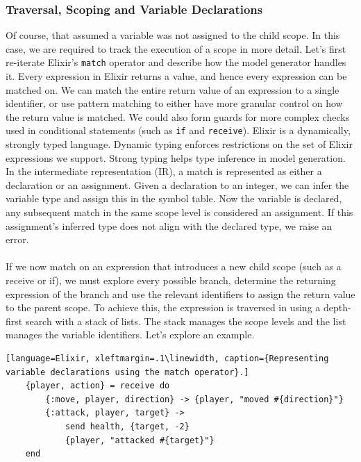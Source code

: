 \subsubsection{Traversal, Scoping and Variable Declarations}
Of course, that assumed a variable was not assigned to the child scope. In this case, we are required to track the execution of a scope in more detail. Let's first re-iterate Elixir's \texttt{match} operator and describe how the model generator handles it. Every expression in Elixir returns a value, and hence every expression can be matched on. We can match the entire return value of an expression to a single identifier, or use pattern matching to either have more granular control on how the return value is matched. We could also form guards for more complex checks used in conditional statements (such as \texttt{if} and \texttt{receive}). Elixir is a dynamically, strongly typed language. Dynamic typing enforces restrictions on the set of Elixir expressions we support. Strong typing helps type inference in model generation. In the intermediate representation (IR), a match is represented as either a declaration or an assignment. Given a declaration to an integer, we can infer the variable type and assign this in the symbol table. Now the variable is declared, any subsequent match in the same scope level is considered an assignment. If this assignment's inferred type does not align with the declared type, we raise an error.
\\ \\
If we now match on an expression that introduces a new child scope (such as a receive or if), we must explore every possible branch, determine the returning expression of the branch and use the relevant identifiers to assign the return value to the parent scope. To achieve this, the expression is traversed in using a depth-first search with a stack of lists. The stack manages the scope levels and the list manages the variable identifiers. Let's explore an example.
\begin{lstlisting}[language=Elixir, xleftmargin=.1\linewidth, caption={Representing variable declarations using the match operator}.]
    {player, action} = receive do
        {:move, player, direction} -> {player, "moved #{direction}"}
        {:attack, player, target} -> 
            send health, {target, -2}
            {player, "attacked #{target}"}
    end
\end{lstlisting}
